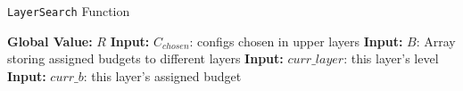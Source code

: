 \begin{algorithm}[h]
  \small
    \caption{\texttt{LayerSearch} Function}
    \label{alg:outer}
\begin{algorithmic}[1]
\STATE \textbf{Global Value:} $R$ 
\STATE \textbf{Input:} $C_{chosen}$: configs chosen in upper layers
\STATE \textbf{Input:} $B$: Array storing assigned budgets to different layers
\STATE \textbf{Input:} $curr\_layer$: this layer's level
\STATE \textbf{Input:} $curr\_b$: this layer's assigned budget


\end{algorithmic}
\end{algorithm}
